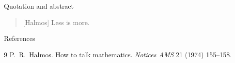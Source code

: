 \documentclass[aspectratio=169]{beamer}
\begin{document}
\begin{frame}{Quotation and abstract}
  \begin{quotation}[Halmos]
    Less is more.
  \end{quotation}
  \begin{abstract}
    An abstract set between two rules.
  \end{abstract}
\end{frame}

\begin{frame}{References}
  \begin{thebibliography}{9}
     P.~R.~Halmos. How to talk mathematics. \emph{Notices AMS} 21 (1974) 155--158.
  \end{thebibliography}
\end{frame}

\end{document}
